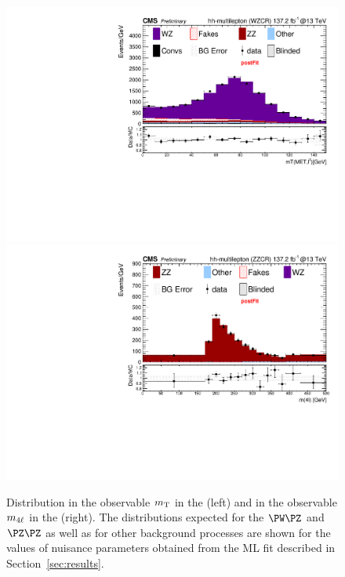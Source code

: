 \begin{figure}
   \centering\includegraphics[width=\cmsFigWidth]{figures/postFitPlots/WZ.pdf}
   \centering\includegraphics[width=\cmsFigWidth]{figures/postFitPlots/ZZ.pdf}
  \caption{
    Distribution in the observable $m_\mathrm{T}$ in the \threeLeptonCR (left) and in the observable $m_{4\ell}$ in the \fourLeptonCR (right).
    The distributions expected for the $\PW\PZ$ and $\PZ\PZ$ as well as for other background processes
    are shown for the values of nuisance parameters obtained from the ML fit described in Section~\ref{sec:results}.
  }
  \label{fig:postfitPlotsCR}
\end{figure}

